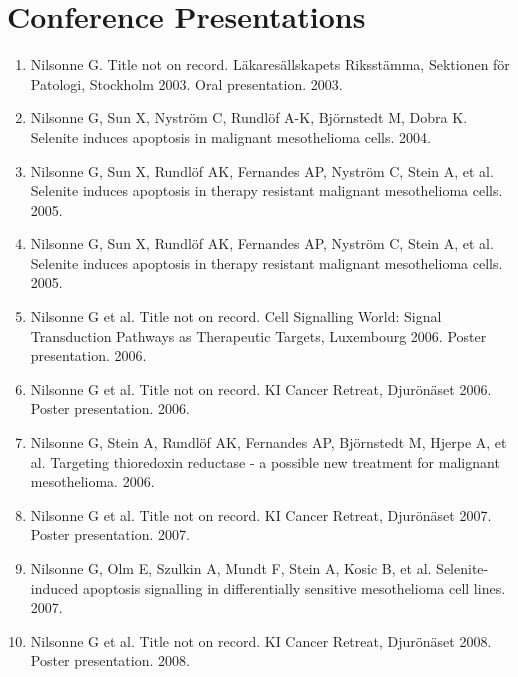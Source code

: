 \documentclass[10pt,a4paper,twocolumn]{article}
\begin{document}

\section{Conference Presentations}
\begin{enumerate}

    \item Nilsonne G. Title not on record. Läkaresällskapets Riksstämma, Sektionen för Patologi, Stockholm 2003. Oral presentation. 2003.

    \item Nilsonne G, Sun X, Nyström C, Rundlöf A-K, Björnstedt M, Dobra K. Selenite induces apoptosis in malignant mesothelioma cells. 2004.

    \item Nilsonne G, Sun X, Rundlöf AK, Fernandes AP, Nyström C, Stein A, et al. Selenite induces apoptosis in therapy resistant malignant mesothelioma cells. 2005.

    \item Nilsonne G, Sun X, Rundlöf AK, Fernandes AP, Nyström C, Stein A, et al. Selenite induces apoptosis in therapy resistant malignant mesothelioma cells. 2005.

    \item Nilsonne G et al. Title not on record. Cell Signalling World: Signal Transduction Pathways as Therapeutic Targets, Luxembourg 2006. Poster presentation. 2006.

    \item Nilsonne G et al. Title not on record. KI Cancer Retreat, Djurönäset 2006. Poster presentation. 2006.

    \item Nilsonne G, Stein A, Rundlöf AK, Fernandes AP, Björnstedt M, Hjerpe A, et al. Targeting thioredoxin reductase - a possible new treatment for malignant mesothelioma. 2006.

    \item Nilsonne G et al. Title not on record. KI Cancer Retreat, Djurönäset 2007. Poster presentation. 2007.

    \item Nilsonne G, Olm E, Szulkin A, Mundt F, Stein A, Kosic B, et al. Selenite-induced apoptosis signalling in differentially sensitive mesothelioma cell lines. 2007.

    \item Nilsonne G et al. Title not on record. KI Cancer Retreat, Djurönäset 2008. Poster presentation. 2008.


\end{enumerate}
\end{document}
